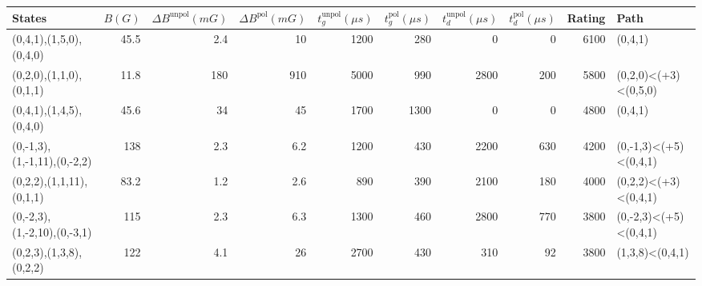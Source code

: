\begin{tabular}{lrrrrrrrrl}
\hline
 {States}                    &   {$B(G)$} &   {$\Delta B^{\text{unpol}}(mG)$} &   {$\Delta B^{\text{pol}}(mG)$} &   {$t^{\text{unpol}}_{g}(\mu s)$} &   {$t^{\text{pol}}_{g}(\mu s)$} &   {$t^{\text{unpol}}_{d}(\mu s)$} &   {$t^{\text{pol}}_{d}(\mu s)$} &   {Rating} & {Path}                  \\
\hline
 (0,4,1),(1,5,0),(0,4,0)     &       45.5 &                              2.4  &                           10    &                              1200 &                             280 &                                 0 &                               0 &       6100 & (0,4,1)                 \\
 (0,2,0),(1,1,0),(0,1,1)     &       11.8 &                            180    &                          910    &                              5000 &                             990 &                              2800 &                             200 &       5800 & (0,2,0)<(+3)<(0,5,0)    \\
 (0,4,1),(1,4,5),(0,4,0)     &       45.6 &                             34    &                           45    &                              1700 &                            1300 &                                 0 &                               0 &       4800 & (0,4,1)                 \\
 (0,-1,3),(1,-1,11),(0,-2,2) &      138   &                              2.3  &                            6.2  &                              1200 &                             430 &                              2200 &                             630 &       4200 & (0,-1,3)<(+5)<(0,4,1)   \\
 (0,2,2),(1,1,11),(0,1,1)    &       83.2 &                              1.2  &                            2.6  &                               890 &                             390 &                              2100 &                             180 &       4000 & (0,2,2)<(+3)<(0,4,1)    \\
 (0,-2,3),(1,-2,10),(0,-3,1) &      115   &                              2.3  &                            6.3  &                              1300 &                             460 &                              2800 &                             770 &       3800 & (0,-2,3)<(+5)<(0,4,1)   \\
 (0,2,3),(1,3,8),(0,2,2)     &      122   &                              4.1  &                           26    &                              2700 &                             430 &                               310 &                              92 &       3800 & (1,3,8)<(0,4,1)         \\

\end{tabular}

